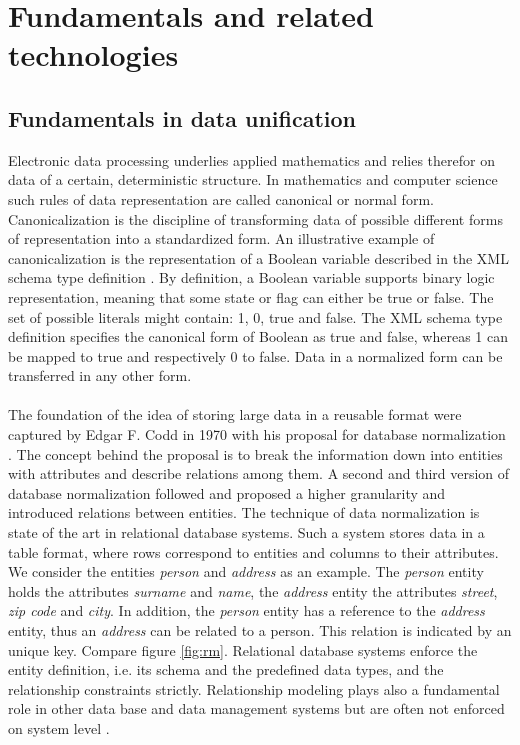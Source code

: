 \chapter{Fundamentals and related technologies\label{cha:chapter2}}

\section{Fundamentals in data unification\label{sec:unification}}

Electronic data processing underlies applied mathematics and relies therefor on data of a certain, deterministic structure. In mathematics and computer science such rules of data representation are called canonical or normal form. Canonicalization is the discipline of transforming data of possible different forms of representation into a standardized form. An illustrative example of canonicalization is the representation of a Boolean variable described in the XML schema type definition \cite{xml_schema_2017}. By definition, a Boolean variable supports binary logic representation, meaning that some state or flag can either be true or false. The set of possible literals might contain: 1, 0, true and false. The XML schema type definition specifies the canonical form of Boolean as true and false, whereas 1 can be mapped to true and respectively 0 to false. Data in a normalized form can be transferred in any other form.
\\\\
The foundation of the idea of storing large data in a reusable format were captured by Edgar F. Codd in 1970 with his proposal for database normalization \cite{codd_1970}. The concept behind the proposal is to break the information down into entities with attributes and describe relations among them. A second and third version of database normalization followed and proposed a higher granularity and introduced relations between entities. The technique of data normalization is state of the art in relational database systems. Such a system stores data in a table format, where rows correspond to entities and columns to their attributes. We consider the entities \textit{person} and \textit{address} as an example. The \textit{person} entity holds the attributes \textit{surname} and \textit{name}, the \textit{address} entity the attributes \textit{street}, \textit{zip code} and \textit{city}. In addition, the \textit{person} entity has a reference to the \textit{address} entity, thus an \textit{address} can be related to a person. This relation is indicated by an unique key. Compare figure \ref{fig:rm}. Relational database systems enforce the entity definition, i.e. its schema and the predefined data types, and the relationship constraints strictly. Relationship modeling plays also a fundamental role in other data base and data management systems but are often not enforced on system level \cite{hills_2016}.

